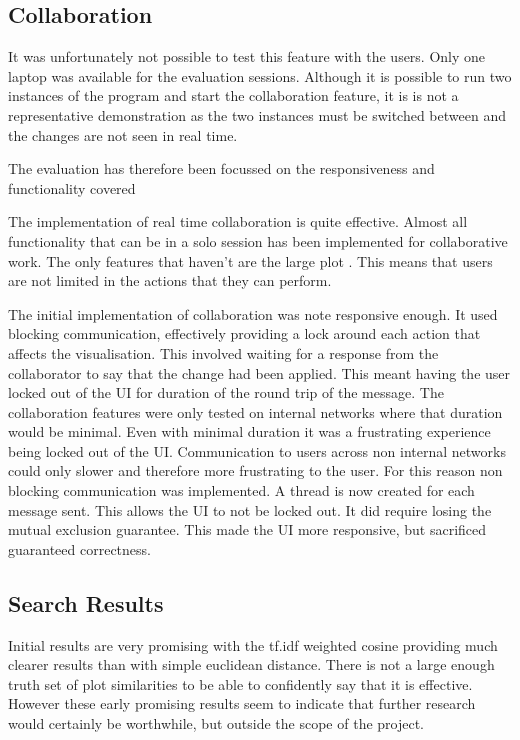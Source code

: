 \subsection{Collaboration}

It was unfortunately not possible to test this feature with the users.  Only one laptop was available for the evaluation sessions.  Although it is possible to run two instances of the program and start the collaboration feature, it is is not a representative demonstration as the two instances must be switched between and the changes are not seen in real time.

The evaluation has therefore been focussed on the responsiveness and functionality covered

The implementation of real time collaboration is quite effective.  Almost all functionality that can be in a solo session has been implemented for collaborative work.  The only features that haven't are the large plot  .  This means that users are not limited in the actions that they can perform.

The initial implementation of collaboration was note responsive enough.  It used blocking communication, effectively providing a lock around each action that affects the visualisation.  This involved waiting for a response from the collaborator to say that the change had been applied.  This meant having the user locked out of the \ac{UI} for duration of the round trip of the message.  The collaboration features were only tested on internal networks where that duration would be minimal.  Even with minimal duration it was a frustrating experience being locked out of the \ac{UI}.  Communication to users across non internal networks could only slower and therefore more frustrating to the user.  For this reason non blocking communication was implemented.  A thread is now created for each message sent.  This allows the \ac{UI} to not be locked out.  It did require losing the mutual exclusion guarantee.  This made the \ac{UI} more responsive, but sacrificed guaranteed correctness.

\subsection{Search Results}
Initial results are very promising with the tf.idf weighted cosine providing much clearer results than with simple euclidean distance.  There is not a large enough truth set of plot similarities to be able to confidently say that it is effective.  However these early promising results seem to indicate that further research would certainly be worthwhile, but outside the scope of the project.


